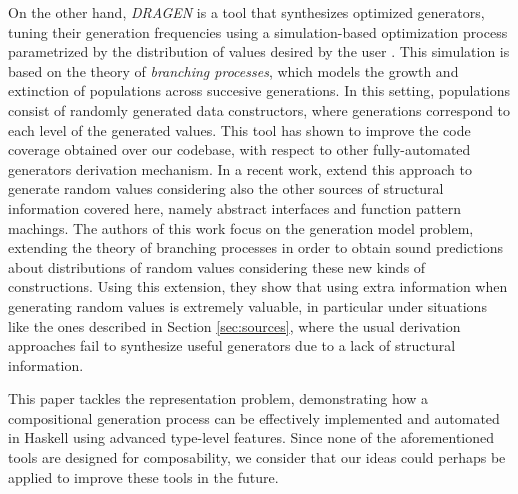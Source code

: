 On the other hand, \emph{DRAGEN} is a tool that synthesizes optimized
generators, tuning their generation frequencies using a simulation-based
optimization process parametrized by the distribution of values desired by the
user \cite{DBLP:conf/haskell/MistaRH18}.
%
This simulation is based on the theory of \emph{branching processes}, which
models the growth and extinction of populations across succesive generations.
%
In this setting, populations consist of randomly generated data constructors,
where generations correspond to each level of the generated values.
%
This tool has shown to improve the code coverage obtained over our codebase,
with respect to other fully-automated generators derivation mechanism.
%
In a recent work, \citeauthor{Mista2019GeneratingRS} extend this approach to
generate random values considering also the other sources of structural
information covered here, namely abstract interfaces and function pattern
machings.
%
The authors of this work focus on the generation model problem, extending the
theory of branching processes in order to obtain sound predictions about
distributions of random values considering these new kinds of constructions.
%
Using this extension, they show that using extra information when generating
random values is extremely valuable, in particular under situations like the
ones described in Section \ref{sec:sources}, where the usual derivation
approaches fail to synthesize useful generators due to a lack of structural
information.


This paper tackles the representation problem, demonstrating how a compositional
generation process can be effectively implemented and automated in Haskell using
advanced type-level features.
%
Since none of the aforementioned tools are designed for composability, we
consider that our ideas could perhaps be applied to improve these tools in the
future.
